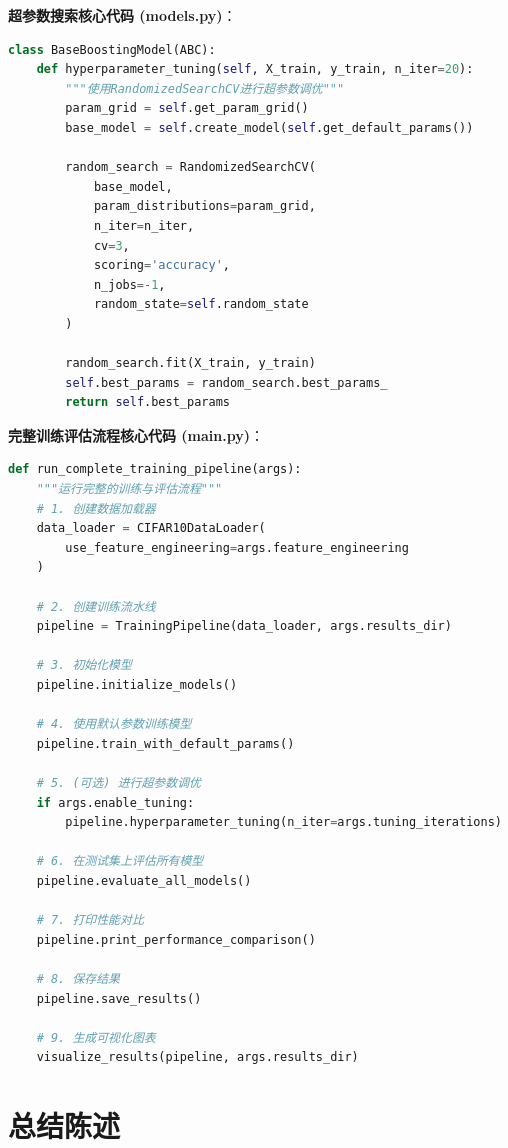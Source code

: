 \documentclass[UTF8]{report}
\theoremstyle{MyLineTheoremStyle} %
\theoremstyle{MyBlockTheoremStyle} %
\theoremstyle{MySubsubsectionStyle} %
\begin{document}
\textbf{超参数搜索核心代码 (models.py)}：
\begin{lstlisting}[language=Python, caption={基于随机搜索的超参数调优}]
class BaseBoostingModel(ABC):
    def hyperparameter_tuning(self, X_train, y_train, n_iter=20):
        """使用RandomizedSearchCV进行超参数调优"""
        param_grid = self.get_param_grid()
        base_model = self.create_model(self.get_default_params())
        
        random_search = RandomizedSearchCV(
            base_model,
            param_distributions=param_grid,
            n_iter=n_iter,
            cv=3,
            scoring='accuracy',
            n_jobs=-1,
            random_state=self.random_state
        )
        
        random_search.fit(X_train, y_train)
        self.best_params = random_search.best_params_
        return self.best_params
\end{lstlisting}

\textbf{完整训练评估流程核心代码 (main.py)}：
\begin{lstlisting}[language=Python, caption={项目主流程编排}]
def run_complete_training_pipeline(args):
    """运行完整的训练与评估流程"""
    # 1. 创建数据加载器
    data_loader = CIFAR10DataLoader(
        use_feature_engineering=args.feature_engineering
    )
    
    # 2. 创建训练流水线
    pipeline = TrainingPipeline(data_loader, args.results_dir)
    
    # 3. 初始化模型
    pipeline.initialize_models()
    
    # 4. 使用默认参数训练模型
    pipeline.train_with_default_params()
    
    # 5. (可选) 进行超参数调优
    if args.enable_tuning:
        pipeline.hyperparameter_tuning(n_iter=args.tuning_iterations)
    
    # 6. 在测试集上评估所有模型
    pipeline.evaluate_all_models()
    
    # 7. 打印性能对比
    pipeline.print_performance_comparison()
    
    # 8. 保存结果
    pipeline.save_results()
    
    # 9. 生成可视化图表
    visualize_results(pipeline, args.results_dir)
\end{lstlisting}




\chapter{总结陈述}
\end{document}
